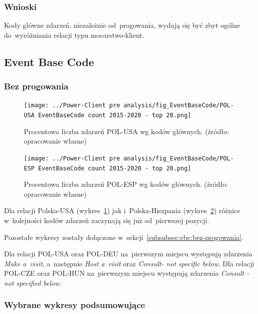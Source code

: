 \documentclass[11pt]{report}
\begin{document}
    \subsubsection{Wnioski}
    Kody główne zdarzeń, niezależnie od~progowania, wydają się być zbyt ogólne do~wyróżniania relacji typu mocarstwo-klient.

    \subsection{Event Base Code}\label{subsec:event-base-code}

    \subsubsection{Bez progowania}

    \begin{figure}[tp]
        \centering
        \texttt{[image: ../Power-Client pre analysis/fig\_EventBaseCode/POL-USA EventBaseCode count 2015-2020 - top 20.png]}
        \caption{Procentowa liczba zdarzeń POL-USA wg kodów głównych. (źródło: opracowanie własne)}
        \label{fig:Power-Client:EBC:POL-USA}
    \end{figure}

    \begin{figure}[tp]
        \centering
        \texttt{[image: ../Power-Client pre analysis/fig\_EventBaseCode/POL-ESP EventBaseCode count 2015-2020 - top 20.png]}
        \caption{Procentowa liczba zdarzeń POL-ESP wg kodów głównych. (źródło: opracowanie własne)}
        \label{fig:Power-Client:EBC:POL-ESP}
    \end{figure}

    Dla relacji Polska-USA (wykres~\ref{fig:Power-Client:EBC:POL-USA}) jak i~Polska-Hiszpania (wykres~\ref{fig:Power-Client:EBC:POL-ESP})
    różnice w~kolejności kodów zdarzeń zaczynają się już od~pierwszej pozycji.

    Pozostałe wykresy zostały dołączone w~sekcji~\ref{subsubsec:ebc:bez-progowania}.

    Dla relacji POL-USA oraz POL-DEU na~pierwszym miejscu występują zdarzenia \textit{Make a~visit}, a~następnie
    \textit{Host a~visit} oraz \textit{Consult- not specific below}.
    Dla relacji POL-CZE oraz POL-HUN na~pierwszym miejscu występują zdarzenia \textit{Consult - not specified below}.

    \subsubsection{Wybrane wykresy podsumowujące}
\end{document}
